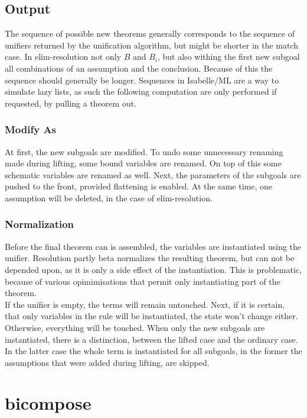 \subsection{Output}
The sequence of possible new theorems generally corresponds to the sequence of unifiers returned by the unification algorithm, but might be shorter in the match case. In elim-resolution not only $B$ and $B_i$, but also withing the first new subgoal all combinations of an assumption and the conclusion. Because of this the sequence should generally be longer. Sequences in Isabelle/ML are a way to simulate lazy lists, as such the following computation are only performed if requested, by pulling a theorem out.

\subsubsection{Modify As}
At first, the new subgoals are modified. To undo some unnecessary renaming made during lifting, some bound variables are renamed. On top of this some schematic variables are renamed as well. Next, the parameters of the subgoals are pushed to the front, provided flattening is enabled. At the same time, one assumption will be deleted, in the case of elim-resolution.

\subsubsection{Normalization}
Before the final theorem can is assembled, the variables are instantiated using the unifier. Resolution partly beta normalizes the resulting theorem, but can not be depended upon, as it is only a side effect of the instantiation. This is problematic, because of various opimimisations that permit only instantiating part of the theorem.\\
If the unifier is empty, the terms will remain untouched. Next, if it is certain, that only variables in the rule will be instantiated, the state won't change either. Otherwise, everything will be touched. When only the new subgoals are instantiated, there is a distinction, between the lifted case and the ordinary case. In the latter case the whole term is instantiated for all subgoals, in the former the assumptions that were added during lifting, are skipped.

\section{bicompose}

